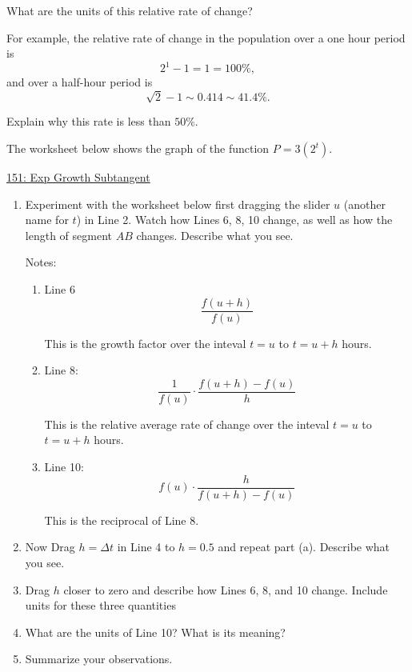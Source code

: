 \documentclass{ximera}
\begin{document}
\begin{question} \label{QODFERerre}
What are the units of this relative rate of change?
\end{question}

For example, the relative rate of change in the population over a one hour period is
\[ 
        2^1 - 1 = 1 = 100\%,
\]
and over a half-hour period is
\[
    \sqrt{2} - 1 \sim 0.414 \sim 41.4\%.
\]

\begin{question} \label{QERdftrre}
Explain why this rate is less than $50\%$.
\end{question}

\begin{exploration} \label{EKDFeredfM}
The worksheet below shows the graph of the function $P=3(2^t)$. 

\href{https://www.desmos.com/calculator/zu0f4jnh4a}{151: Exp Growth Subtangent}

 
\begin{onlineOnly}
    \begin{center}
\end{center}
\end{onlineOnly}


\begin{enumerate}
\item Experiment with the worksheet below first dragging the slider $u$ (another name for $t$) in Line 2. Watch how Lines 6, 8, 10 change, as well as how the length of segment $AB$ changes. Describe what you see.

Notes:

\begin{enumerate}
\item Line 6
\[
\frac{f(u+h)}{f(u)}
\]

This is the growth factor over the inteval $t=u$ to $t=u+h$ hours.

\item Line 8: 
\[
    \frac{1}{f(u)}\cdot \frac{f(u+h)-f(u)}{h}
\]

This is the relative average rate of change over the inteval $t=u$ to $t=u+h$ hours.

\item Line 10:
\[
    f(u) \cdot \frac{h}{f(u+h)-f(u)}
\]

This is the reciprocal of Line 8.
\end{enumerate}


\item Now Drag $h=\Delta t$ in Line 4 to $h=0.5$ and repeat part (a). Describe what you see.

\item Drag $h$ closer to zero and describe how Lines 6, 8, and 10 change. Include units for these three quantities

\item What are the units of Line 10? What is its meaning?

\item Summarize your observations.

\end{enumerate}
\end{exploration}
\end{document}
